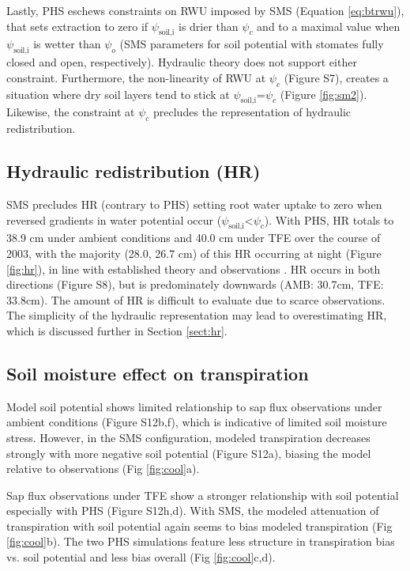 \documentclass[draft,linenumbers]{agujournal}
\begin{document}
Lastly, PHS eschews constraints on RWU imposed by SMS (Equation \ref{eq:btrwu}), that sets extraction to zero if $\psi_{\text{soil,i}}$ is drier than $\psi_c$ and to a maximal value when $\psi_{\text{soil,i}}$ is wetter than $\psi_o$ (SMS parameters for soil potential with stomates fully closed and open, respectively).
Hydraulic theory does not support either constraint.
Furthermore, the non-linearity of RWU at $\psi_c$ (Figure S7), creates a situation where dry soil layers tend to stick at $\psi_{\text{soil,i}}$=$\psi_c$ (Figure \ref{fig:sm2}).
Likewise, the constraint at $\psi_c$ precludes the representation of hydraulic redistribution.

\subsection{Hydraulic redistribution (HR)}
    SMS precludes HR (contrary to PHS) setting root water uptake to zero when reversed gradients in water potential occur ($\psi_{\text{soil,i}}$<$\psi_c$).
    With PHS, HR totals to 38.9 cm under ambient conditions and 40.0 cm under TFE over the course of 2003, with the majority (28.0, 26.7 cm) of this HR occurring at night (Figure \ref{fig:hr}),
    in line with established theory \citep{jackson2000,lee2005} and observations \citep{oliveira2005,burgess1998}.
    HR occurs in both directions (Figure S8), but is predominately downwards (AMB: 30.7cm, TFE: 33.8cm).
    The amount of HR is difficult to evaluate due to scarce observations.
    The simplicity of the hydraulic representation may lead to overestimating HR, which is discussed further in Section \ref{sect:hr}.

\subsection{Soil moisture effect on transpiration}
\label{sect:smpt}
    Model soil potential shows limited relationship to sap flux observations under ambient conditions (Figure S12b,f), which is indicative of limited soil moisture stress.
    However, in the SMS configuration, modeled transpiration decreases strongly with more negative soil potential (Figure S12a),
    biasing the model relative to observations (Fig \ref{fig:cool}a).
    
    Sap flux observations under TFE show a stronger relationship with soil potential especially with PHS (Figure S12h,d).
    With SMS, the modeled attenuation of transpiration with soil potential again seems to bias modeled transpiration (Fig \ref{fig:cool}b).
    The two PHS simulations feature less structure in transpiration bias vs. soil potential and less bias overall (Fig \ref{fig:cool}c,d).
    
\end{document}
